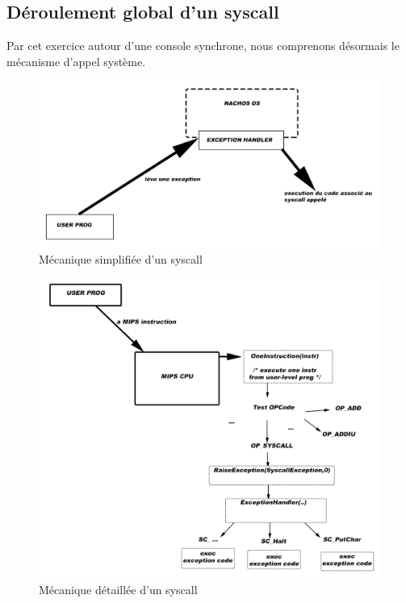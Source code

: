 \documentclass[a4paper,10pt]{article}
\begin{document}
\subsection{Déroulement global d'un syscall}
Par cet exercice autour d'une console synchrone, nous comprenons désormais le mécanisme d'appel système.
\begin{figure}[h]
  \begin{center}
    \includegraphics[scale=0.3]{./nachos_syscall.png}
   \caption{\label{syscall} Mécanique simplifiée d'un syscall}
  \end{center}
\end{figure}
\newpage
\begin{figure}[h]
\begin{center}
    \includegraphics[scale=0.39]{./nachos_syscall_details.png}
   \caption{\label{syscall_det} Mécanique détaillée d'un syscall}
  \end{center}
\end{figure}
\end{document}
